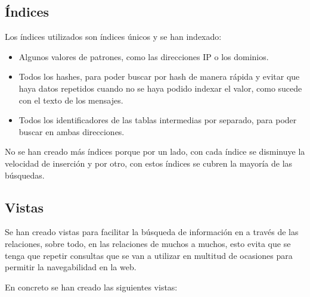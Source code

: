 \subsection{Índices}
Los índices utilizados son índices únicos y se han indexado:

\begin{itemize}
    \item Algunos valores de patrones, como las direcciones IP o los dominios.
    \item Todos los hashes, para poder buscar por hash de manera rápida y evitar que haya datos repetidos cuando no se haya podido indexar el valor, como sucede con el texto de los mensajes.
    \item Todos los identificadores de las tablas intermedias por separado, para poder buscar en ambas direcciones.
\end{itemize}

No se han creado más índices porque por un lado, con cada índice se disminuye la velocidad de inserción \cite{mysql_index_optimitation} y por otro, con estos índices se cubren la mayoría de las búsquedas. 

\subsection{Vistas}
Se han creado vistas para facilitar la búsqueda de información en a través de las relaciones, sobre todo, en las relaciones de muchos a muchos, esto evita que se tenga que repetir consultas que se van a utilizar en multitud de ocasiones para permitir la navegabilidad en la web. 

En concreto se han creado las siguientes vistas:

